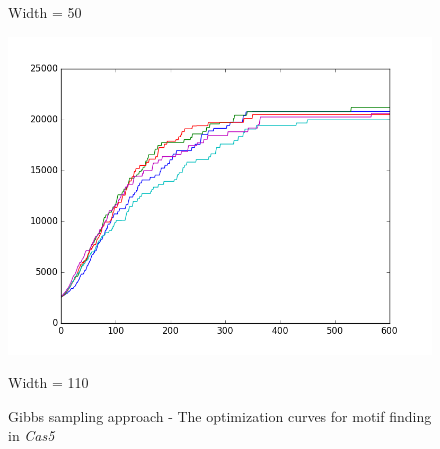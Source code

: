 \documentclass[11pt, oneside]{article}
\begin{document}
\begin{figure}[htbp]
\begin{minipage}{0.32\textwidth}
    \caption*{Width = 50}
  \end{minipage}
  \hfill
  \begin{minipage}{0.32\textwidth}
    \centering
    \includegraphics[width=1\textwidth]{images/cas5_width110_curve} %
    \caption*{Width = 110}
  \end{minipage}
  \caption{Gibbs sampling approach - The optimization curves for motif finding in \textit{Cas5}}
  \label{fig:cas5}
\end{figure}
\end{document}
